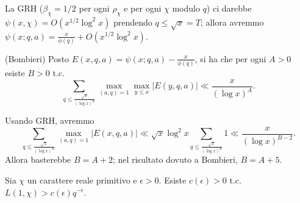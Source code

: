 La GRH ($\beta_\chi=1/2$ per ogni $\rho_\chi$ e per ogni $\chi$ modulo $q$) ci darebbe $\psi(x,\chi)=O(x^{1/2}\log^2{x})$ prendendo $q \le \sqrt{x}=T$; allora avremmo $\psi(x;q,a)=\frac{x}{\phi(q)}+O(x^{1/2}\log^2{x})$.

\begin{prop}
  (Bombieri) Posto $E(x,q,a)=\psi(x;q,a)-\frac{x}{\phi(q)}$, si ha che per ogni $A>0$ esiste $B>0$ t.c.
  $$\sum_{q \le \frac{\sqrt{x}}{(\log{x})^B}} \max_{(a,q)=1}\max_{y \le x} |E(y,q,a)| \ll \frac{x}{(\log{x})^A}.$$
\end{prop}

\begin{oss}
  Usando GRH, avremmo
  $$\sum_{q \le \frac{\sqrt{x}}{(\log{x})^B}} \max_{(a,q)=1} |E(x,q,a)| \ll \sqrt{x}\log^2{x} \sum_{q \le \frac{\sqrt{x}}{(\log{x})^B}} 1 \ll \frac{x}{(\log{x})^{B-2}}.$$
  Allora basterebbe $B=A+2$; nel risultato dovuto a Bombieri, $B=A+5$.
\end{oss}

\begin{prop}
  Sia $\chi$ un carattere reale primitivo e $\epsilon>0$. Esiste $c(\epsilon)>0$ t.c. $L(1,\chi)>c(\epsilon)q^{-\epsilon}$.
\end{prop}

